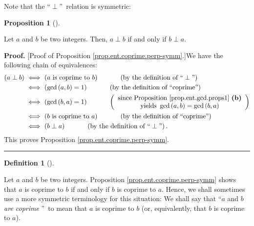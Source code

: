 \documentclass[numbers=enddot,12pt,final,onecolumn,notitlepage]{scrartcl}%
\numberwithin{exer}{subsection}
\theoremstyle{definition}
\newtheorem{prop}[theo]{Proposition}
\newenvironment{proposition}[1][]
{\begin{prop}[#1]\begin{leftbar}}
{\end{leftbar}\end{prop}}
\newtheorem{defi}[theo]{Definition}
\newenvironment{definition}[1][]
{\begin{defi}[#1]\begin{leftbar}}
{\end{leftbar}\end{defi}}
\newenvironment{proof}[1][Proof]{\noindent\textbf{#1.} }{\ \rule{0.5em}{0.5em}}
\begin{document}
Note that the \textquotedblleft$\perp$\textquotedblright\ relation is symmetric:

\begin{proposition}
\label{prop.ent.coprime.perp-symm}Let $a$ and $b$ be two integers. Then,
$a\perp b$ if and only if $b\perp a$.
\end{proposition}

\begin{proof}
[Proof of Proposition \ref{prop.ent.coprime.perp-symm}.]We have the following
chain of equivalences:%
\begin{align*}
\left(  a\perp b\right)  \  &  \Longleftrightarrow\ \left(  a\text{ is coprime
to }b\right)  \ \ \ \ \ \ \ \ \ \ \left(  \text{by the definition of
\textquotedblleft}\perp\text{\textquotedblright}\right) \\
&  \Longleftrightarrow\ \left(  \gcd\left(  a,b\right)  =1\right)
\ \ \ \ \ \ \ \ \ \ \left(  \text{by the definition of \textquotedblleft
coprime\textquotedblright}\right) \\
&  \Longleftrightarrow\ \left(  \gcd\left(  b,a\right)  =1\right)
\ \ \ \ \ \ \ \ \ \ \left(
\begin{array}
[c]{c}%
\text{since Proposition \ref{prop.ent.gcd.props1} \textbf{(b)}}\\
\text{yields }\gcd\left(  a,b\right)  =\gcd\left(  b,a\right)
\end{array}
\right) \\
&  \Longleftrightarrow\ \left(  b\text{ is coprime to }a\right)
\ \ \ \ \ \ \ \ \ \ \left(  \text{by the definition of \textquotedblleft
coprime\textquotedblright}\right) \\
&  \Longleftrightarrow\ \left(  b\perp a\right)  \ \ \ \ \ \ \ \ \ \ \left(
\text{by the definition of \textquotedblleft}\perp\text{\textquotedblright%
}\right)  .
\end{align*}
This proves Proposition \ref{prop.ent.coprime.perp-symm}.
\end{proof}

\begin{definition}
Let $a$ and $b$ be two integers. Proposition \ref{prop.ent.coprime.perp-symm}
shows that $a$ is coprime to $b$ if and only if $b$ is coprime to $a$. Hence,
we shall sometimes use a more symmetric terminology for this situation: We
shall say that \textquotedblleft$a$ and $b$ \textit{are coprime}%
\textquotedblright\ to mean that $a$ is coprime to $b$ (or, equivalently, that
$b$ is coprime to $a$).
\end{definition}
\end{document}
